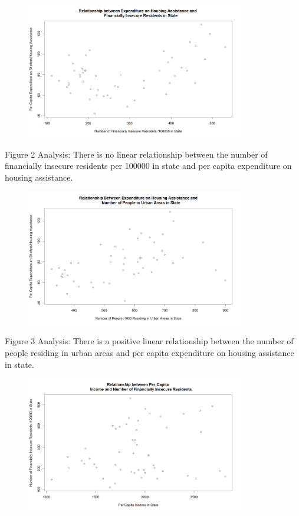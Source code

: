 \documentclass[12pt,letterpaper]{article}
\begin{document}
\begin{itemize}
		\begin{figure}[h!]
			\centering
			\caption{\footnotesize}
			\label{fig:plot_2}
			\includegraphics[width=0.85\textwidth]{Figure1.2}  
		\end{figure}
		\noindent
		Figure 2 Analysis: There is no linear relationship between the number of financially insecure residents per 100000 in state and per capita expenditure on housing assistance.
		\begin{figure}[h!]
			\centering
			\caption{\footnotesize}
			\label{fig:plot_3}
			\includegraphics[width=0.85\textwidth]{Figure1.3}
		\end{figure}
		
		\noindent
		Figure 3 Analysis: There is a positive linear relationship between the number of people residing in urban areas and per capita expenditure on housing assistance in state.
		\begin{figure}[h!]
			\centering
			\caption{\footnotesize}
			\label{fig:plot_4}
			\includegraphics[width=0.85\textwidth]{Figure1.4}
		\end{figure}
		

\end{itemize}
\end{document}

